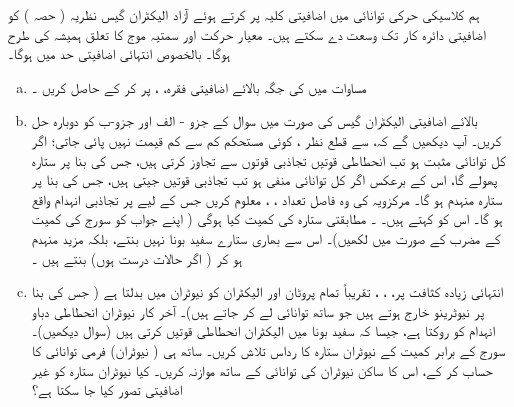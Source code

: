 ہم کلاسیکی حرکی توانائی  میں اضافیتی کلیہ  پر کرتے ہوئے    آزاد الیکٹران گیس نظریہ  ( حصہ  ) کو اضافیتی دائرہ کار تک وسعت دے سکتے ہیں۔  معیار حرکت اور سمتیہ موج کا تعلق ہمیشہ کی طرح  ہوگا۔ بالخصوص انتہائی اضافیتی حد میں  ہوگا۔ 
\begin{enumerate}[a.]
\item
مساوات    میں  کی جگہ بالائے اضافیتی فقرہ،  ،  پر کر کے   حاصل کریں ۔
\item
بالائے اضافیتی الیکٹران گیس کی صورت میں  سوال    کے جزو - الف  اور  جزو-ب  کو دوبارہ حل کریں۔ آپ دیکھیں گے کہ،    سے قطع نظر ، کوئی مستحکم کم سے کم   قیمت نہیں پائی  جاتی؛   اگر کل توانائی مثبت ہو تب انحطاطی قوتیں تجاذبی قوتوں  سے تجاوز کرتی ہیں،  جس کی بنا پر ستارہ پھولے گا،  اس کے برعکس اگر کل  توانائی منفی ہو تب تجاذبی  قوتيں  جیتی ہیں، جس کی بنا پر ستارہ منہدم ہو گا۔ مرکزویہ کی وہ فاصل تعداد ، ،  معلوم کریں جس کے لیے  پر تجاذبی انہدام واقع  ہو گا۔ اس کو     کہتے ہیں۔   ۔ مطابقتی ستارہ کی کمیت کیا ہوگی ( اپنے جواب کو سورج کی کمیت کے مضرب کے صورت میں لکھیں)۔  اس سے بھاری ستارے  سفید بونا نہیں بنتے،  بلکہ مزید منہدم ہو کر ( اگر حالات درست ہوں)    بنتے  ہیں ۔
\item
انتہائی زیادہ کثافت پر،  ،   ،  تقریباً تمام پروٹان اور الیکٹران کو نیوٹران میں بدلتا ہے ( جس کی بنا پر نیوٹرینو خارج ہوتے ہیں جو ساتھ توانائی لے کر جاتے ہیں)۔  آخر کار نیوٹران انحطاطی دباو انہدام کو روکتا ہے، جیسا کہ سفید بونا میں الیکٹران انحطاطی قوتیں  کرتی ہیں  (سوال    دیکھیں)۔  سورج کے برابر کمیت کے نیوٹران ستارہ کا رداس تلاش کریں۔ ساتھ ہی ( نیوٹران)  فرمی توانائی کا حساب کر کے، اس کا  ساکن نیوٹران کی توانائی کے ساتھ موازنہ کریں۔ کیا نیوٹران ستارہ کو غیر اضافیتی تصور کیا جا سکتا ہے؟ 
\end{enumerate}
